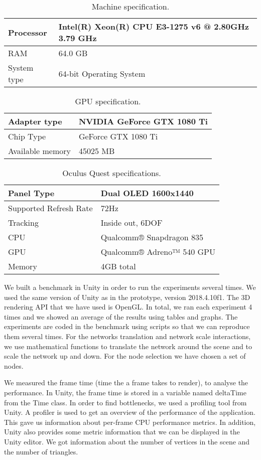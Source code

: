 \begin{table}[h!]
\centering
\begin{tabular}{ll}
\hline
Processor   & Intel(R) Xeon(R) CPU E3-1275 v6 @ 2.80GHz 3.79 GHz \\
\hline
RAM & 64.0 GB                                            \\
System type & 64-bit Operating System
\end{tabular}
\caption{Machine specification.}
\label{tab:machine-specs}
\end{table}

\begin{table}[h!]
\centering
\begin{tabular}{ll}
\hline
Adapter type   & NVIDIA GeForce GTX 1080 Ti \\
\hline
Chip Type  &  GeForce GTX 1080 Ti \\
Available memory & 45025 MB
\end{tabular}
\caption{GPU specification.}
\label{tab:gpu-specs}
\end{table}

\begin{table}[h!]
\centering
\begin{tabular}{ll}
\hline
Panel Type   & Dual OLED 1600x1440 \\
\hline
Supported Refresh Rate  &  72Hz \\
Tracking & Inside out, 6DOF \\
CPU & Qualcomm® Snapdragon 835 \\
GPU & Qualcomm® Adreno™ 540 GPU \\
Memory & 4GB total
\end{tabular}
\caption{Oculus Quest specifications.}
\label{tab:oculus-specs}
\end{table}

We built a benchmark in Unity in order to run the experiments several times. We used the same version of Unity as in the prototype, version 2018.4.10f1. The 3D rendering API that we have used is OpenGL. In total, we ran each experiment 4 times and we showed an average of the results using tables and graphs. The experiments are coded in the benchmark using scripts so that we can reproduce them several times. For the networks translation and network scale interactions, we use mathematical functions to translate the network around the scene and to scale the network up and down. For the node selection we have chosen a set of nodes.

We measured the frame time (time the a frame takes to render), to analyse the performance. In Unity, the frame time is stored in a variable named deltaTime from the Time class. In order to find bottlenecks, we used a profiling tool from Unity. A profiler is used to get an overview of the performance of the application. This gave us information about per-frame CPU performance metrics. In addition, Unity also provides some metric information that we can be displayed in the Unity editor. We got information about the number of vertices in the scene and the number of triangles.

